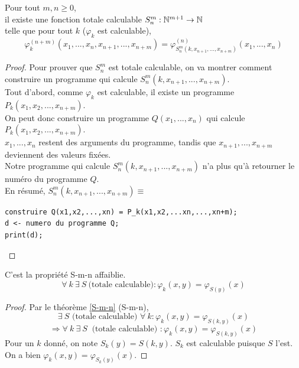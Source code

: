 \begin{mytheo}[S-m-n]
	\label{S-m-n}Pour tout $m,n \geq 0$, \\
	il existe une fonction totale calculable $S^m_n : \mathbb{N}^{m+1} \rightarrow
	\mathbb{N}$ \\
	telle que pour tout $k$ ($\varphi_k$ est calculable),
	$$ \varphi^{(n+m)}_k(x_1,...,x_n,x_{n+1},...,x_{n+m}) =
	\varphi^{(n)}_{S^m_n(k,x_{n+1}, ...,x_{n+m})} (x_1,...,x_n)$$
\end{mytheo}

\begin{proof}
	Pour prouver que $S^m_n$ est totale calculable, on va montrer comment construire un programme qui
	calcule  $S^m_n(k,x_{n+1}, ...,x_{n+m})$.\\
	Tout d'abord, comme $\varphi_k$ est calculable, il existe un programme
	$P_k(x_1,x_2,...,x_{n+m})$.\\
	On peut donc construire un programme $Q(x_1,...,x_n)$ qui calcule
	$P_k(x_1,x_2,...,x_{n+m})$.\\
	$x_1,...,x_n$ restent des arguments du programme,
	tandis que $x_{n+1},...,x_{n+m}$ deviennent des valeurs fixées.\\
	Notre programme qui calcule $S^m_n(k,x_{n+1}, ...,x_{n+m})$ n'a plus
	qu'à retourner le numéro du programme $Q$.\\
       	En résumé, $S^m_n(k,x_{n+1},
	...,x_{n+m}) \equiv$
	\begin{lstlisting}
construire Q(x1,x2,...,xn) = P_k(x1,x2,...xn,...,xn+m);
d <- numero du programme Q;
print(d);
	\end{lstlisting}
\end{proof}

\begin{mytheo}[S]
	C'est la propriété S-m-n affaiblie.
	\[ \forall \ k \ \exists \ S \ \text{(totale calculable)} : \varphi_k(x,y)=\varphi_{S(y)}(x)\]
\end{mytheo}

\begin{proof}
Par le théorème \ref{S-m-n} (S-m-n),
	\[ \exists \ S \text{ (totale calculable) } \forall \ k : \varphi_k(x,y)=\varphi_{S(k,y)}(x)\]
	\[\Rightarrow \forall \ k \ \exists \ S \ \text{ (totale calculable) } : \varphi_k(x,y)=\varphi_{S(k,y)}(x)\]
    Pour un $k$ donné, on note $S_k(y)=S(k,y)$. $S_k$ est calculable puisque $S$ l'est. On a bien $\varphi_k(x,y) = \varphi_{S_k(y)}(x)$.
\end{proof}

